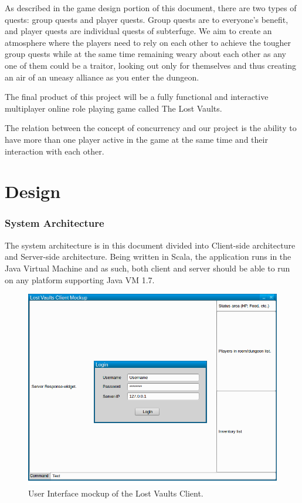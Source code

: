 \documentclass[a4paper]{article}
\begin{document}
As described in the game design portion of this document, there are two types of quests: group quests and player quests. Group quests are to everyone's benefit, and player 
quests are individual quests of subterfuge. We aim to create an atmosphere where the players need to rely on each other to achieve the tougher group quests while at the same 
time remaining weary about each other as any one of them could be a traitor, looking out only for themselves and thus creating an air of an uneasy alliance as you enter the dungeon.

The final product of this project will be a fully functional and interactive multiplayer online role playing game called The Lost Vaults.

The relation between the concept of concurrency and our project is the ability to have more than one player active in the game at the same time and their interaction with each other.
\part{Design}
\section{System Architecture}
The system architecture is in this document divided into  Client-side architecture and Server-side architecture. Being written in Scala, the application runs in the Java Virtual Machine and 
as such, both client and server should be able to run on any platform supporting Java VM 1.7.
\begin{figure}[hbt]
\centering
\includegraphics[width=1.0\textwidth]{clientmockup}
\caption{\label{fig:Client}User Interface mockup of the Lost Vaults Client.}
\end{figure}
\end{document}
